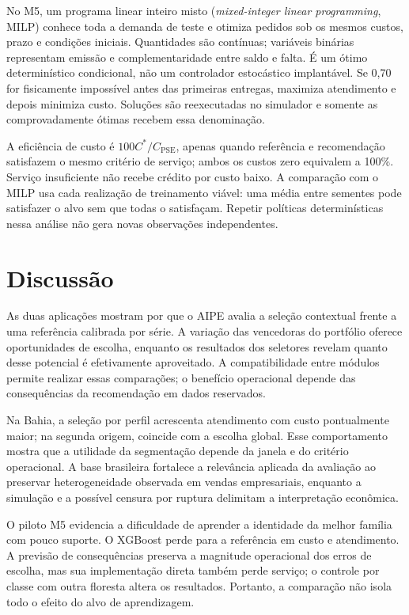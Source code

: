 \documentclass[preprint,12pt]{elsarticle}
\begin{document}
No M5, um programa linear inteiro misto (\textit{mixed-integer linear programming}, MILP) conhece toda a demanda de teste e otimiza pedidos sob os mesmos custos, prazo e condições iniciais. Quantidades são contínuas; variáveis binárias representam emissão e complementaridade entre saldo e falta. É um ótimo determinístico condicional, não um controlador estocástico implantável. Se 0,70 for fisicamente impossível antes das primeiras entregas, maximiza atendimento e depois minimiza custo. Soluções são reexecutadas no simulador e somente as comprovadamente ótimas recebem essa denominação.

A eficiência de custo é $100C^*/C_{\mathrm{PSE}}$, apenas quando referência e recomendação satisfazem o mesmo critério de serviço; ambos os custos zero equivalem a 100\%. Serviço insuficiente não recebe crédito por custo baixo. A comparação com o MILP usa cada realização de treinamento viável: uma média entre sementes pode satisfazer o alvo sem que todas o satisfaçam. Repetir políticas determinísticas nessa análise não gera novas observações independentes.





\section{Discussão}
As duas aplicações mostram por que o AIPE avalia a seleção contextual frente a uma referência calibrada por série. A variação das vencedoras do portfólio oferece oportunidades de escolha, enquanto os resultados dos seletores revelam quanto desse potencial é efetivamente aproveitado. A compatibilidade entre módulos permite realizar essas comparações; o benefício operacional depende das consequências da recomendação em dados reservados.

Na Bahia, a seleção por perfil acrescenta atendimento com custo pontualmente maior; na segunda origem, coincide com a escolha global. Esse comportamento mostra que a utilidade da segmentação depende da janela e do critério operacional. A base brasileira fortalece a relevância aplicada da avaliação ao preservar heterogeneidade observada em vendas empresariais, enquanto a simulação e a possível censura por ruptura delimitam a interpretação econômica.

O piloto M5 evidencia a dificuldade de aprender a identidade da melhor família com pouco suporte. O XGBoost perde para a referência em custo e atendimento. A previsão de consequências preserva a magnitude operacional dos erros de escolha, mas sua implementação direta também perde serviço; o controle por classe com outra floresta altera os resultados. Portanto, a comparação não isola todo o efeito do alvo de aprendizagem.
\end{document}
